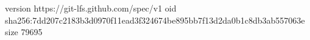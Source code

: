 version https://git-lfs.github.com/spec/v1
oid sha256:7dd207c2183b3d0970f11ead3f324674be895bb7f13d2da0b1c8db3ab557063e
size 79695
